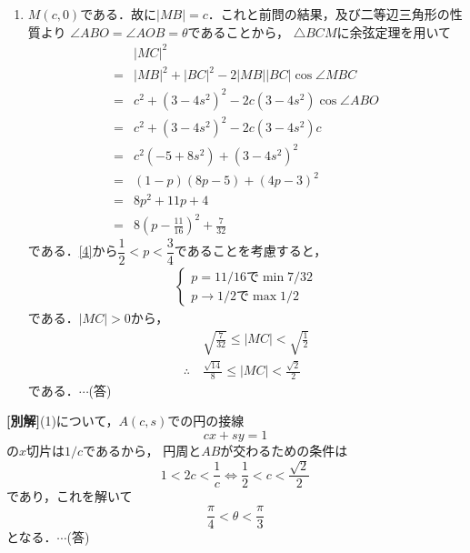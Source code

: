 \documentclass[a4j]{jarticle}
\begin{document}
\begin{multicols}{2}
\begin{enumerate}[(1)]
     \item $M(c,0)$である．故に$|MB|=c$．これと前問の結果，及び二等辺三角形の性質より
     $\angle ABO=\angle AOB=\theta$であることから，
     $\triangle BCM$に余弦定理を用いて
          \begin{align*}
          &|MC|^2 \\
          =&|MB|^2+|BC|^2-2|MB||BC|\cos\angle MBC  \\
          =&c^2+(3-4s^2)^2-2c(3-4s^2)\cos\angle ABO \\
          =&c^2+(3-4s^2)^2-2c(3-4s^2)c　\\
          =&c^2(-5+8s^2)+(3-4s^2)^2 \\
          =&(1-p)(8p-5)+(4p-3)^2   \tag{$p=s^2$}\\ 
          =&8p^2+11p+4  \\
          =&8\left(p-\frac{11}{16}\right)^2+\frac{7}{32}
          \end{align*}     
     である．\eqref{4}から$\dfrac{1}{2}<p<\dfrac{3}{4}$であることを考慮すると，
          \begin{align*}
          \left\{
               \begin{array}{l}
               p=11/16\text{で}\min7/32 \\
               p\to 1/2\text{で}\max 1/2
               \end{array}
          \right.
          \end{align*}
     である．$|MC|>0$から，
          \begin{align*}
          &\sqrt{\frac{7}{32}}\le|MC|<\sqrt{\frac{1}{2}} \\
          \therefore \ &\frac{\sqrt{14}}{8}\le|MC|<\frac{\sqrt{2}}{2}
          \end{align*}
     である．$\cdots$(答)
     \end{enumerate}

{\bf[別解]}(1)について，$A(c,s)$での円の接線
     \[cx+sy=1\]
の$x$切片は$1/c$であるから，
円周と$AB$が交わるための条件は
      \[1<2c<\frac{1}{c}\Longleftrightarrow \frac{1}{2}<c<\frac{\sqrt{2}}{2}\]
であり，これを解いて
      \[\frac{\pi}{4}<\theta<\frac{\pi}{3}\]
となる．$\cdots$(答)
\newpage
\end{multicols}
\end{document}
